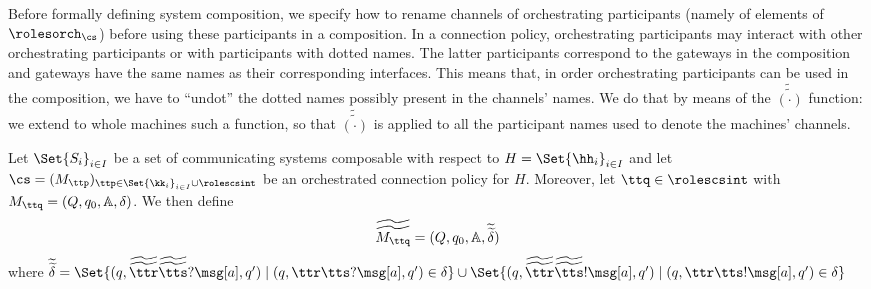 
%


Before formally defining system composition, we specify how to rename channels of 
orchestrating participants (namely of elements of $\rolesorch_{\cs}$) before using these participants
in a composition.
In a connection policy, orchestrating participants may interact with other orchestrating participants
or with participants with dotted names. The latter participants correspond to the gateways in the
composition and gateways have the same names as their corresponding 
interfaces. 
This means that, in order orchestrating participants can be used in the composition,
we have to ``undot'' the dotted names possibly present in the channels' names.
We do that by means of the $\widetilde{\widetilde{(\cdot)}}$ function: 
we extend to whole machines such a function, so that $\widetilde{\widetilde{(\cdot)}}$
is applied to all the participant names used to denote the machines' channels.
\begin{definition}
\label{def:tildetildem}
Let $\Set{S_i}_{i\in I}$ be a set of communicating systems composable with respect to $H=\Set{\hh_i}_{i\in I}$ 
and let  $\cs=(M_{\ttp})_{\ttp\in \Set{\kk_i}_{i\in I}\cup\rolescsint}$  
 be an orchestrated connection policy for $H$. Moreover, let $\ttq\in\rolescsint$
 with $M_{\ttq}= (Q, q_0,\mathbb{A},\delta)$. We then define
 $$\widetilde{\widetilde{M_\ttq}} = (Q, q_0,\mathbb{A},\widetilde{\widetilde\delta})$$
 where $\widetilde{\widetilde\delta} = \Set{(q,\widetilde{\widetilde\ttr}\widetilde{\widetilde\tts}?\msg[a],q') \mid (q,{\ttr}{\tts}?\msg[a],q')\in\delta}\cup \Set{(q,\widetilde{\widetilde\ttr}\widetilde{\widetilde\tts}!\msg[a],q') \mid (q,{\ttr}{\tts}!\msg[a],q')\in\delta}$
\end{definition}



